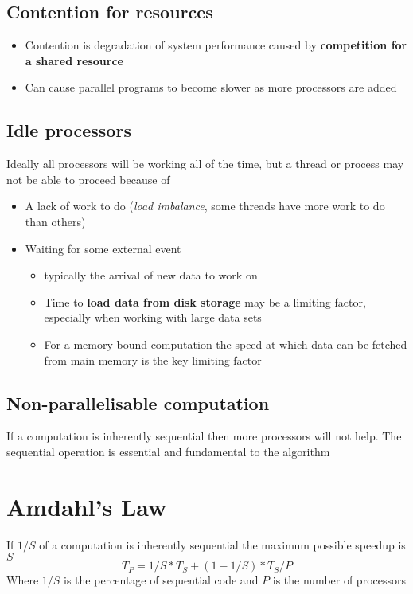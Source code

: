 \documentclass{article}
\begin{document}
\subsection{Contention for resources}
\begin{itemize}
  \item Contention is degradation of system performance caused by \textbf{competition for a shared resource}
  \item Can cause parallel programs to become slower as more processors are added
\end{itemize}

\subsection{Idle processors}
\begin{flushleft}
Ideally all processors will be working all of the time, but a thread or process may not be able to proceed because of
\end{flushleft}
\begin{itemize}
  \item A lack of work to do (\textit{load imbalance}, some threads have more work to do than others)
  \item Waiting for some external event
  \begin{itemize}
    \item typically the arrival of new data to work on 
    \item Time to \textbf{load data from disk storage} may be a limiting factor, especially when working with large data sets 
    \item For a memory-bound computation the speed at which data can be fetched from main memory is the key limiting factor
  \end{itemize}
\end{itemize}

\subsection{Non-parallelisable computation}
\begin{flushleft}
If a computation is inherently sequential then more processors will not help. The sequential operation is essential and fundamental to the algorithm
\end{flushleft}

\section{Amdahl’s Law}
\begin{flushleft}
If $1/S$ of a computation is inherently sequential the maximum possible speedup is $S$
\[ T_P = 1/S * T_S + (1 - 1/S) * T_S / P \]
Where $1/S$ is the percentage of sequential code and $P$ is the number of processors
\end{flushleft}
\end{document}
